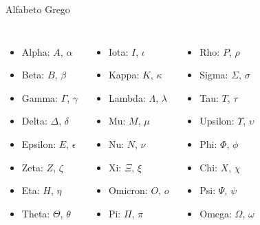 \begin{frame}{Alfabeto Grego}
  \begin{columns}
    \begin{itemize}
      \item Alpha: $A$, $\alpha$
      \item Beta: $B$, $\beta$
      \item Gamma: $\Gamma$, $\gamma$
      \item Delta: $\Delta$, $\delta$
      \item Epsilon: $E$, $\epsilon$
      \item Zeta: $Z$, $\zeta$
      \item Eta: $H$, $\eta$
      \item Theta: $\Theta$, $\theta$
    \end{itemize}
    \begin{itemize}
      \item Iota: $I$, $\iota$
      \item Kappa: $K$, $\kappa$
      \item Lambda: $\Lambda$, $\lambda$
      \item Mu: $M$, $\mu$
      \item Nu: $N$, $\nu$
      \item Xi: $\Xi$, $\xi$
      \item Omicron: $O$, $o$
      \item Pi: $\Pi$, $\pi$
    \end{itemize}
    \begin{itemize}
      \item Rho: $P$, $\rho$
      \item Sigma: $\Sigma$, $\sigma$
      \item Tau: $T$, $\tau$
      \item Upsilon: $\Upsilon$, $\upsilon$
      \item Phi: $\Phi$, $\phi$
      \item Chi: $X$, $\chi$
      \item Psi: $\Psi$, $\psi$
      \item Omega: $\Omega$, $\omega$
    \end{itemize}
  \end{columns}
\end{frame}
